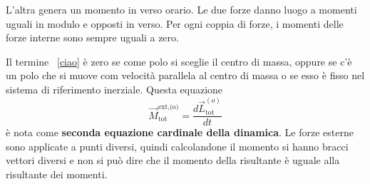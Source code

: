 \documentclass[10pt,a4paper]{book}
\begin{document}
\begin{figure}[htpb]
\end{figure}
\FloatBarrier
L'altra genera un momento in verso orario. Le due forze danno luogo a momenti uguali in modulo e opposti in verso. Per ogni coppia di forze, i momenti delle forze interne sono sempre uguali a zero.

Il termine ~\eqref{ciao} è zero se come polo si sceglie il centro di massa, oppure se c'è un polo che si muove com velocità parallela al centro di massa o se esso è fisso nel sistema di riferimento inerziale. Questa equazione
\[
	\boxed{\vec{M}_\text{tot}^\text{ext,(o)}=\frac{d\vec{L}_\text{tot}^{(o)}}{dt}}
\]
è nota come \textbf{seconda equazione cardinale della dinamica}. Le forze esterne sono applicate a punti diversi, quindi calcolandone il momento si hanno bracci vettori diversi e non si può dire che il momento della risultante è uguale alla risultante dei momenti.
\end{document}
